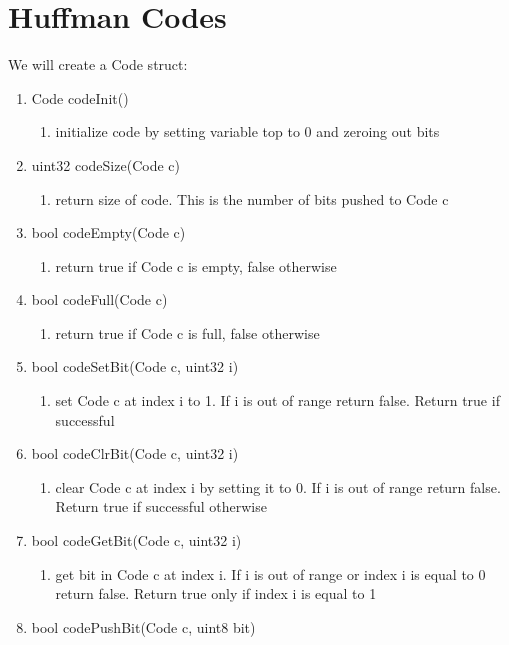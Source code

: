 \documentclass[11pt]{article}
\begin{document}
\section{Huffman Codes}\label{ss:codes}
We will create a Code struct:
\begin{enumerate}
\item Code codeInit()
	\begin{enumerate}
	\item initialize code by setting variable top to 0 and zeroing out bits
	\end{enumerate}
\item uint32 codeSize(Code c)
	\begin{enumerate}
	\item return size of code. This is the number of bits pushed to Code c
	\end{enumerate}
\item bool codeEmpty(Code c)
	\begin{enumerate}
	\item return true if Code c is empty, false otherwise
	\end{enumerate}
\item bool codeFull(Code c)
	\begin{enumerate}
	\item return true if Code c is full, false otherwise
	\end{enumerate}
\item bool codeSetBit(Code c, uint32 i)
	\begin{enumerate}
	\item set Code c at index i to 1. If i is out of range return false. Return true if successful
	\end{enumerate}
\item bool codeClrBit(Code c, uint32 i)
	\begin{enumerate}
	\item clear Code c at index i by setting it to 0. If i is out of range return false. Return true if successful otherwise
	\end{enumerate}
\item bool codeGetBit(Code c, uint32 i)
	\begin{enumerate}
	\item get bit in Code c at index i. If i is out of range or index i is equal to 0 return false. Return true only if index i is equal to 1
	\end{enumerate}
\item bool codePushBit(Code c, uint8 bit)
	\begin{enumerate}

\end{enumerate}
\end{enumerate}
\end{document}
